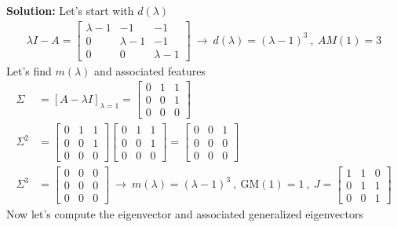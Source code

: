 \documentclass[twoside]{article}
\begin{document}
\textbf{Solution:} Let's start with  $d(\lambda)$
%
\begin{align*}
  \lambda I - A = \left[ \begin{array}{ccc} \lambda - 1 & -1 & -1 \\ 0 & \lambda - 1 & -1 \\ 0 & 0 & \lambda - 1 \end{array} \right] 
  \ \rightarrow \ d(\lambda) = (\lambda - 1)^3 \ , \ AM(1) = 3
\end{align*}
% 
Let's find $m(\lambda)$ and associated features
%
%
\begin{align*}
  \Sigma &= \left[ A - \lambda I \right]_{\lambda = 1} = \left[ \begin{array}{ccc} 0 & 1 & 1 \\ 0 & 0 & 1 \\ 0 & 0 & 0 \end{array} \right] 
  \\
  \Sigma^2 &= \left[ \begin{array}{ccc} 0 & 1 & 1 \\ 0 & 0 & 1 \\ 0 & 0 & 0 \end{array} \right]  \left[ \begin{array}{ccc} 0 & 1 & 1 \\ 0 & 0 & 1 \\ 0 & 0 & 0 \end{array} \right] = \left[ \begin{array}{ccc} 0 & 0 & 1 \\ 0 & 0 & 0 \\ 0 & 0 & 0 \end{array} \right]
  \\
  \Sigma^3 &= \left[ \begin{array}{ccc} 0 & 0 & 0 \\ 0 & 0 & 0 \\ 0 & 0 & 0 \end{array} \right] \ \rightarrow \ m(\lambda) = (\lambda - 1)^3 \ , \ 
  \mathrm{GM}(1) = 1 \ , \ J = \left[ \begin{array}{ccc} 1 & 1 & 0 \\ 0 & 1 & 1 \\ 0 & 0 & 1 \end{array} \right] 
\end{align*}
% 
Now let's compute the eigenvector and associated generalized eigenvectors
%
\end{document}

